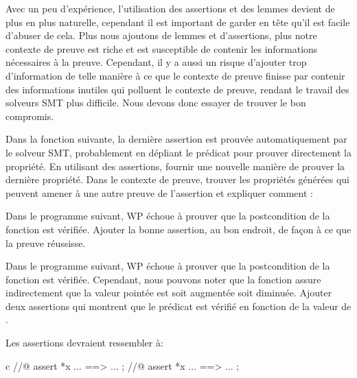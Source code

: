 Avec un peu d'expérience, l'utilisation des assertions et des lemmes devient de
plus en plus naturelle, cependant il est important de garder en tête qu'il est
facile d'abuser de cela. Plus nous ajoutons de lemmes et d'assertions, plus notre
contexte de preuve est riche et est susceptible de contenir les informations
nécessaires à la preuve. Cependant, il y a aussi un risque d'ajouter trop
d'information de telle manière à ce que le contexte de preuve finisse par contenir
des informations inutiles qui polluent le contexte de preuve, rendant le travail
des solveurs SMT plus difficile. Nous devons donc essayer de trouver le bon
compromis.






Dans la fonction suivante, la dernière assertion est prouvée automatiquement
par le solveur SMT, probablement en dépliant le prédicat pour prouver
directement la propriété. En utilisant des assertions, fournir une nouvelle
manière de prouver la dernière propriété. Dans le contexte de preuve, trouver
les propriétés générées qui peuvent amener à une autre preuve de l'assertion
et expliquer comment :






Dans le programme suivant, WP échoue à prouver que la postcondition de la
fonction  est vérifiée. Ajouter la bonne assertion, au bon endroit,
de façon à ce que la preuve réussisse.






Dans le programme suivant, WP échoue à prouver que la postcondition de la
fonction  est vérifiée. Cependant, nous pouvons noter
que la fonction  assure indirectement que la valeur pointée
est soit augmentée soit diminuée. Ajouter deux assertions qui montrent que
le prédicat est vérifié en fonction de la valeur de .




Les assertions devraient ressembler à:


\begin{CodeBlock}{c}
//@ assert *x ... ==> ... ;
//@ assert *x ... ==> ... ;
\end{CodeBlock}



